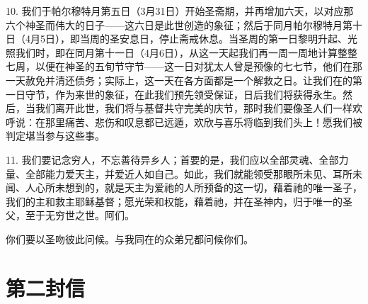 10. 我们于帕尔穆特月第五日（3月31日）开始圣斋期，并再增加六天，以对应那六个神圣而伟大的日子——这六日是此世创造的象征；然后于同月帕尔穆特月第十日（4月5日），即当周的圣安息日，停止斋戒休息。当圣周的第一日黎明升起、光照我们时，即在同月第十一日（4月6日），从这一天起我们再一周一周地计算整整七周，以便在神圣的五旬节守节——这一日对犹太人曾是预像的七七节，他们在那一天赦免并清还债务；实际上，这一天在各方面都是一个解救之日。让我们在的第一日守节，作为来世的象征，在此我们预先领受保证，日后我们将获得永生。然后，当我们离开此世，我们将与基督共守完美的庆节，那时我们要像圣人们一样欢呼说：在那里痛苦、悲伤和叹息都已远遁，欢欣与喜乐将临到我们头上！愿我们被判定堪当参与这些事。\par

11. 我们要记念穷人，不忘善待异乡人；首要的是，我们应以全部灵魂、全部力量、全部能力爱天主，并爱近人如自己。如此，我们就能领受那眼所未见、耳所未闻、人心所未想到的，就是天主为爱祂的人所预备的这一切，藉着祂的唯一圣子，我们的主和救主耶稣基督；愿光荣和权能，藉着祂，并在圣神内，归于唯一的圣父，至于无穷世之世。阿们。\par

你们要以圣吻彼此问候。与我同在的众弟兄都问候你们。\par



\section{第二封信}

\par

